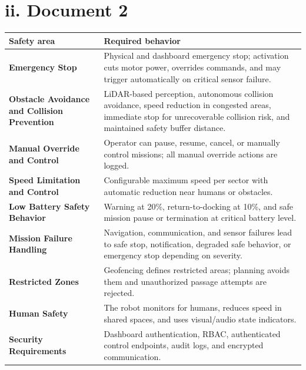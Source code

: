 \section*{ii. Document 2}

\begin{table}[H]
\centering
\begin{tabularx}{\textwidth}{>{\bfseries}L{0.26\textwidth}Y}
\toprule
Safety area & Required behavior \\
\midrule
Emergency Stop & Physical and dashboard emergency stop; activation cuts motor power, overrides commands, and may trigger automatically on critical sensor failure. \\
Obstacle Avoidance and Collision Prevention & LiDAR-based perception, autonomous collision avoidance, speed reduction in congested areas, immediate stop for unrecoverable collision risk, and maintained safety buffer distance. \\
Manual Override and Control & Operator can pause, resume, cancel, or manually control missions; all manual override actions are logged. \\
Speed Limitation and Control & Configurable maximum speed per sector with automatic reduction near humans or obstacles. \\
Low Battery Safety Behavior & Warning at 20\%, return-to-docking at 10\%, and safe mission pause or termination at critical battery level. \\
Mission Failure Handling & Navigation, communication, and sensor failures lead to safe stop, notification, degraded safe behavior, or emergency stop depending on severity. \\
Restricted Zones & Geofencing defines restricted areas; planning avoids them and unauthorized passage attempts are rejected. \\
Human Safety & The robot monitors for humans, reduces speed in shared spaces, and uses visual/audio state indicators. \\
Security Requirements & Dashboard authentication, RBAC, authenticated control endpoints, audit logs, and encrypted communication. \\
\bottomrule
\end{tabularx}
\end{table}
